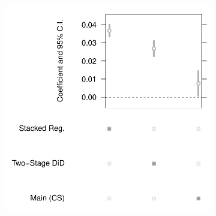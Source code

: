 \documentclass[12pt]{article}
\begin{document}
\begin{figure}[t!]
\begin{subfigure}{0.48\textwidth}
\includegraphics[width=\linewidth]{Objects/frac_office_est_plot.pdf}
\label{fig:b}
\end{subfigure}


\end{figure}
\end{document}
